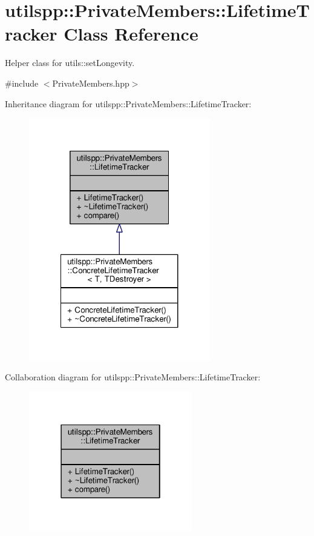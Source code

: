 \hypertarget{classutilspp_1_1PrivateMembers_1_1LifetimeTracker}{\section{utilspp\-:\-:Private\-Members\-:\-:Lifetime\-Tracker Class Reference}
\label{classutilspp_1_1PrivateMembers_1_1LifetimeTracker}
}


Helper class for utils\-::set\-Longevity.  




{\ttfamily \#include $<$Private\-Members.\-hpp$>$}



Inheritance diagram for utilspp\-:\-:Private\-Members\-:\-:Lifetime\-Tracker\-:
\nopagebreak
\begin{figure}[H]
\begin{center}
\leavevmode
\includegraphics[width=224pt]{classutilspp_1_1PrivateMembers_1_1LifetimeTracker__inherit__graph}
\end{center}
\end{figure}


Collaboration diagram for utilspp\-:\-:Private\-Members\-:\-:Lifetime\-Tracker\-:
\nopagebreak
\begin{figure}[H]
\begin{center}
\leavevmode
\includegraphics[width=202pt]{classutilspp_1_1PrivateMembers_1_1LifetimeTracker__coll__graph}
\end{center}
\end{figure}
